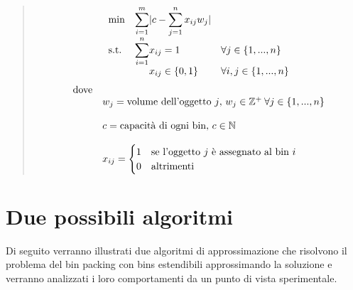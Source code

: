 \begin{quote}	
	\begin{equation*}
		\begin{array}{ll@{}ll}
			\text{min}  & \displaystyle\sum\limits_{i=1}^{m} & |c - \displaystyle\sum\limits_{j=1}^{n} x_{ij}w_j|   & \\
			\text{s.t.} & \displaystyle\sum\limits_{i=1}^{n} & x_{ij} = 1 			  								& \forall j \in \{1, ..., n\} \\ 
		                & 								     														& x_{ij} \in \{0,1\}  	  & \forall i, j \in \{1, ..., n\} \\
		\end{array}
	\end{equation*}
	\begin{equation*}
		\begin{array}{ll@{}ll}
	    	\text{dove} &																									   & \\
	    				& w_j = \text{volume dell'oggetto } j	\text{, } w_j \in \mathbb{Z}^+ \: \forall j \in \{1, ..., n\}  & \\ \\ 
		    			& c = \text{capacità di ogni bin, } c \in \mathbb{N} 												   & \\ \\
						& x_{ij} = 
							\begin{cases}
    							1 & \text{se l'oggetto } j \text{ è assegnato al bin } i \\
    							0 & \text{altrimenti}
							\end{cases}					    																   & \\
		\end{array}
	\end{equation*}
\end{quote}

\section{Due possibili algoritmi}
Di seguito verranno illustrati due algoritmi di approssimazione che risolvono il problema del bin packing con bins estendibili approssimando
la soluzione e verranno analizzati i loro comportamenti da un punto di vista sperimentale.
